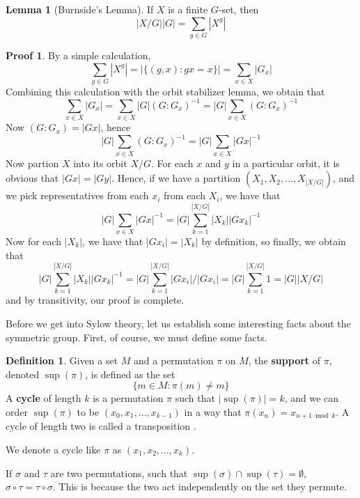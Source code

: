 \documentclass[12pt]{amsbook}
\theoremstyle{definition}
\newtheorem{lemma}[theorem]{Lemma}
\newtheorem{definition}{Definition}
\newtheorem*{prf}{Proof}
\begin{document}
\begin{lemma}[Burnside's Lemma] 
    If $X$ is a finite $G$-set, then
    \[ |X/G||G| = \sum_{g \in G} |X^g| \]
\end{lemma}
\begin{prf}
    By a simple calculation,
    \[ \sum_{g \in G} |X^g| = |\{(g,x): gx = x\}| = \sum_{x \in X} |G_x| \]
    Combining this calculation with the orbit stabilizer lemma, we obtain that
    \[ \sum_{x \in X} |G_x| = \sum_{x \in X} |G|(G:G_x)^{-1} = |G| \sum_{x \in X} (G:G_x)^{-1} \]
    Now $(G:G_x) = |Gx|$, hence
    \[ |G| \sum_{x \in X} (G:G_x)^{-1} = |G| \sum_{x \in X} |Gx|^{-1} \]
    Now partion $X$ into its orbit $X/G$. For each $x$ and $y$ in a particular orbit, it is obvious that $|Gx| = |Gy|$. Hence, if we have a partition $(X_1, X_2, \dots, X_{|X/G|})$, and we pick representatives from each $x_i$ from each $X_i$, we have that
    \[ |G| \sum_{x \in X} |Gx|^{-1} = |G| \sum_{k = 1}^{|X/G|} |X_k||Gx_k|^{-1} \]
    Now for each $|X_k|$, we have that $|Gx_i| = |X_k|$ by definition, so finally, we obtain that
    \[ |G| \sum_{k = 1}^{|X/G|} |X_k||Gx_k|^{-1} = |G| \sum_{k = 1}^{|X/G|} |Gx_i|/|Gx_i| = |G| \sum_{k = 1}^{|X/G|} 1 = |G||X/G| \]
    and by transitivity, our proof is complete.
\end{prf}

Before we get into Sylow theory, let us establish some interesting facts about the symmetric group. First, of course, we must define some facts.

\begin{definition}
    Given a set $M$ and a permutation $\pi$ on $M$, the {\bf support}  of $\pi$, denoted $\sup(\pi)$, is defined as the set
    \[ \{ m \in M : \pi(m) \neq m \} \]
    A {\bf cycle}  of length $k$ is a permutation $\pi$ such that $|\sup(\pi)| = k$, and we can order $\sup(\pi)$ to be $(x_0, x_1, \dots, x_{k-1})$ in a way that $\pi(x_n) = x_{n+1 \bmod k}$. A cycle of length two is called a transposition .
\end{definition}

We denote a cycle like $\pi$ as $(x_1, x_2, \dots, x_k)$.

If $\sigma$ and $\tau$ are two permutations, such that $\sup(\sigma) \cap \sup(\tau) = \emptyset$, $\sigma \circ \tau = \tau \circ \sigma$. This is because the two act independently on the set they permute.
\end{document}
